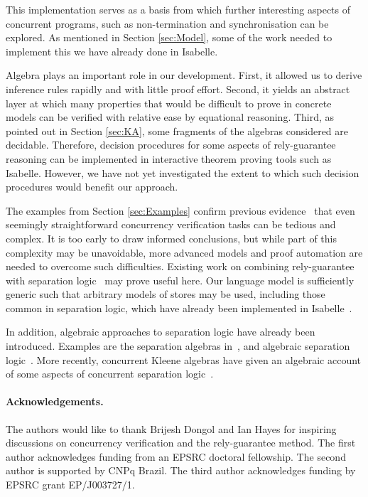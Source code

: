 \documentclass{llncs}
\begin{document}
This implementation serves as a basis from which further interesting
aspects of concurrent programs, such as non-termination and
synchronisation can be explored. As mentioned in Section
\ref{sec:Model}, some of the work needed to implement this we have
already done in Isabelle.

Algebra plays an important role in our development. First, it allowed
us to derive inference rules rapidly and with little proof
effort. Second, it yields an abstract layer at which many properties
that would be difficult to prove in concrete models can be verified
with relative ease by equational reasoning. Third, as pointed out in
Section \ref{sec:KA}, some fragments of the algebras considered are
decidable. Therefore, decision procedures for some aspects of
rely-guarantee reasoning can be implemented in interactive theorem
proving tools such as Isabelle. However, we have not yet
investigated the extent to which such decision procedures would benefit
our approach.

The examples from Section \ref{sec:Examples} confirm previous
evidence~\cite{nieto_rely-guarantee_2003} that even seemingly
straightforward concurrency verification tasks can be tedious and complex. It is
too early to draw informed conclusions, but while part of this complexity
may be unavoidable, more advanced models and proof automation are
needed to overcome such difficulties. Existing work on combining
rely-guarantee with separation logic~\cite{vafeiadis_modular_2008} may
prove useful here. Our language model is sufficiently generic such
that arbitrary models of stores may be used, including those common in
separation logic, which have already been implemented in Isabelle~\cite{klein_mechanised_2012}.

In addition, algebraic approaches to separation logic have already
been introduced. Examples are the separation algebras
in~\cite{calcagno_local_2007}, and algebraic separation
logic~\cite{dang_algebraic_2011}. More recently, concurrent Kleene
algebras have given an algebraic account of some aspects of concurrent
separation logic~\cite{hoare_concurrent_2011,hoare_locality_2011}.

\paragraph*{Acknowledgements.} The authors would like to thank Brijesh
Dongol and Ian Hayes for inspiring discussions on concurrency
verification and the rely-guarantee method. The first author
acknowledges funding from an EPSRC doctoral fellowship. The second
author is supported by CNPq Brazil. The third
author acknowledges funding by EPSRC grant EP/J003727/1.

{}

\end{document}
